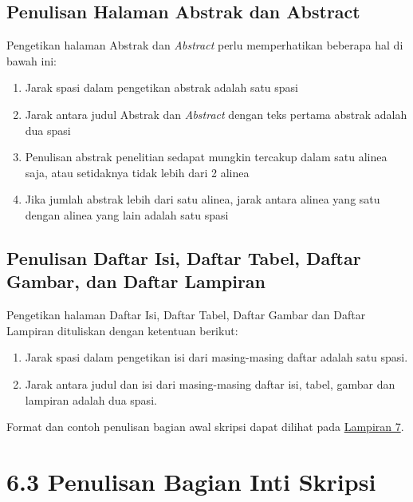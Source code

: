 \documentclass[
  indonesian,
  letterpaper,
]{scrbook}
\providecommand{\tightlist}{%
  \setlength{\itemsep}{0pt}\setlength{\parskip}{0pt}}
\begin{document}
\subsection{Penulisan Halaman Abstrak dan
Abstract}\label{penulisan-halaman-abstrak-dan-abstract}

Pengetikan halaman Abstrak dan \emph{Abstract} perlu memperhatikan
beberapa hal di bawah ini:

\begin{enumerate}
\def\labelenumi{\arabic{enumi}.}
\tightlist
\item
  Jarak spasi dalam pengetikan abstrak adalah satu spasi
\item
  Jarak antara judul Abstrak dan \emph{Abstract} dengan teks pertama
  abstrak adalah dua spasi
\item
  Penulisan abstrak penelitian sedapat mungkin tercakup dalam satu
  alinea saja, atau setidaknya tidak lebih dari 2 alinea
\item
  Jika jumlah abstrak lebih dari satu alinea, jarak antara alinea yang
  satu dengan alinea yang lain adalah satu spasi
\end{enumerate}

\subsection{Penulisan Daftar Isi, Daftar Tabel, Daftar Gambar, dan
Daftar
Lampiran}\label{penulisan-daftar-isi-daftar-tabel-daftar-gambar-dan-daftar-lampiran}

Pengetikan halaman Daftar Isi, Daftar Tabel, Daftar Gambar dan Daftar
Lampiran dituliskan dengan ketentuan berikut:

\begin{enumerate}
\def\labelenumi{\arabic{enumi}.}
\tightlist
\item
  Jarak spasi dalam pengetikan isi dari masing-masing daftar adalah satu
  spasi.
\item
  Jarak antara judul dan isi dari masing-masing daftar isi, tabel,
  gambar dan lampiran adalah dua spasi.
\end{enumerate}

Format dan contoh penulisan bagian awal skripsi dapat dilihat pada
\hyperref[_Lampiran_7_Contoh]{Lampiran 7}.

\section{6.3 Penulisan Bagian Inti
Skripsi}\label{penulisan-bagian-inti-skripsi}
\end{document}
